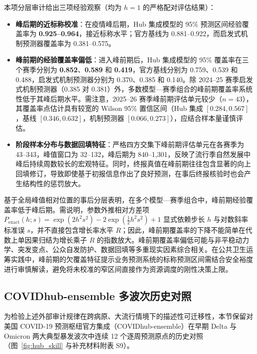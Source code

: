 \documentclass[11pt,a4paper]{article}
\theoremstyle{plain}
\theoremstyle{definition}
\begin{document}
本项分层审计给出三项经验观察（均为 $h=1$ 的严格配对评估结果）：
\begin{itemize}[leftmargin=*,itemsep=0.2pt,topsep=1pt,parsep=0pt]
\item \textbf{峰后期的近标称校准}：在疫情峰后期，Hub 集成模型的 95\% 预测区间经验覆盖率为 \textbf{0.925--0.964}，接近标称水平；官方基线为 0.881--0.922，而启发式机制预测器覆盖率为 0.381--0.575。
\item \textbf{峰前期的经验覆盖率偏低}：进入峰前期后，Hub 集成模型的 95\% 覆盖率在三个赛季分别为 \textbf{0.852}、\textbf{0.589} 和 \textbf{0.419}，官方基线分别为 0.759、0.539 和 0.488，启发式机制预测器分别为 0.370、0.385 和 0.140。除 2024--25 赛季启发式机制预测器（0.385 对 0.381）外，多数模型—赛季组合的峰前期覆盖率系统性低于其峰后期水平。需注意，2025--26 赛季峰前期评估单元较少（$n=43$），其覆盖率点估计具有较宽的 Wilson 95\% 置信区间（Hub 集成 $[0.284, 0.567]$，基线 $[0.346, 0.632]$，机制预测器 $[0.066, 0.273]$），应结合样本量谨慎评估。
\item \textbf{阶段样本分布与数据回填特征}：严格四方交集下峰前期评估单元在各赛季为 43--343，峰值窗口为 32--132，峰后期为 840--1,301，反映了流行季自然发展中峰后持续周数较长的宏观特征。同时，终报真值在峰前期往往包含显著的向上回填修订，导致即使基于初报信息作出了良好预测，在事后终报核验时也会产生结构性的惩罚放大。
\end{itemize}

基于全局峰值相对位置的事后分层表明，在多个模型—赛季组合中，峰前期经验覆盖率低于峰后期。需说明，参数外推相对方差项 $P_{\text{exact}}(h; s) = \exp(2h^2s^2) - 2\exp(\tfrac{1}{2}h^2s^2) + 1$ 显式依赖步长 $h$ 与对数斜率标准误 $s$，并不直接包含增长率水平 $R$；因此，峰前期覆盖率的下降不能简单在代数上单因果归结为增长乘子 $R$ 的指数放大。峰前期覆盖率偏低可能与非平稳动力学、突发变点、公众自发防护、数据回填等多重现实因素综合相关。在公共卫生运筹实践中，峰前期的欠覆盖特征提示业务预测系统的标称预测区间需结合安全裕度进行审慎解读，避免将未校准的窄区间直接作为资源调度的刚性决策上限。

\subsection{COVIDhub-ensemble 多波次历史对照}\label{sec:covidhub_control}

为检验上述外部审计规律在跨病原、大流行情境下的描述性可迁移性，本节保留对美国 COVID-19 预测枢纽官方集成（COVIDhub-ensemble）在早期 Delta 与 Omicron 两大典型暴发波次中连续 12 个逐周预测原点的历史对照（图~\ref{fig:hub_skill} 与补充材料附表 S9）。
\end{document}
